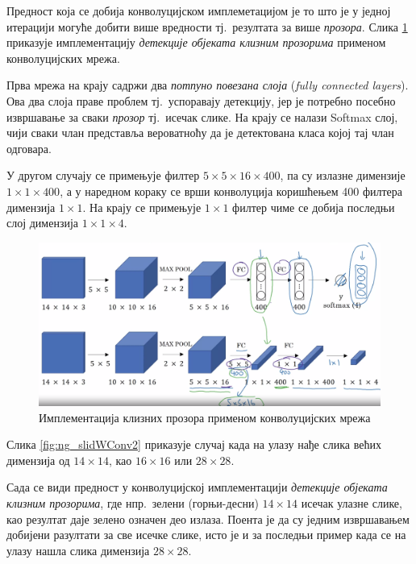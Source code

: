 \documentclass[12pt, а4paper]{article}
\begin{document}
Предност која се добија конволуцијском имплеметацијом је то што
је у једној итерацији могуће добити више вредности тј.\ резултата
за више \textit{прозора}. Слика \ref{fig:ng_slidWConv1} приказује
имплементацију \textit{детекције објеката клизним прозорима} применом
конволуцијских мрежа.

Прва мрежа на крају
садржи два \textit{потпуно повезана слоја} (\textit{fully connected layers}).
Ова два слоја праве проблем тј.\ успоравају детекцију, јер је
потребно посебно извршавање за сваки \textit{прозор} тј.\ исечак слике. На крају се
налази Softmax слој, чији сваки члан представља вероватноћу да је детектована класа
којој тај члан одговара.

У другом случају се примењује филтер \mbox{$5 \times 5 \times 16 \times 400$}, па
су излазне димензије \mbox{$1 \times 1 \times 400$}, а у наредном кораку се врши конволуција
коришћењем 400 филтера димензија $1 \times 1$. На крају се примењује $1 \times 1$ филтер чиме се добија
последњи слој димензија \mbox{$1 \times 1 \times 4$}.

\begin{figure}[H]
  \centering
      \includegraphics[scale=0.3]{slike/ngSlidWConv1.png}
  \caption{Имплементација клизних прозора применом конволуцијских мрежа}
  \label{fig:ng_slidWConv1}
\end{figure}

Слика \ref{fig:ng_slidWConv2} приказује случај када на улазу нађе слика
већих димензија од $14 \times 14$, као 	$16 \times 16$ или $28 \times 28$.

Сада се види предност у конволуцијској имплементацији
\textit{детекције објеката клизним прозорима}, где нпр.\ зелени
(\mbox{горњи-десни})
$14 \times 14$ исечак улазне слике, као резултат даје зелено означен
део излаза.
\newpage
Поента је да су једним извршавањем добијени разултати
за све исечке слике, исто је и за последњи пример када се на улазу нашла
слика димензија $28 \times 28$.
\end{document}
